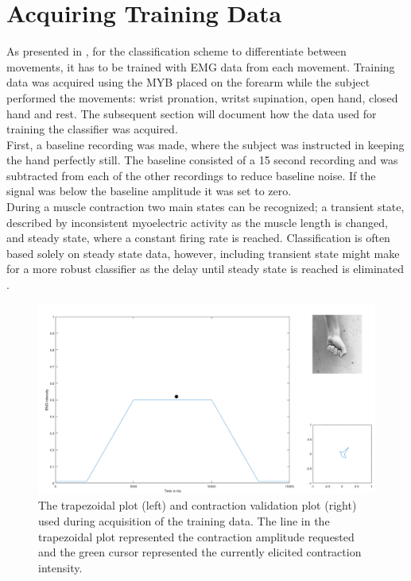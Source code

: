 
\section{Acquiring Training Data}

As presented in , for the classification scheme to differentiate between movements, it has to be trained with EMG data from each movement. Training data was acquired using the MYB placed on the forearm while the subject performed the movements: wrist pronation, writst supination, open hand, closed hand and rest. The subsequent section will document how the data used for training the classifier was acquired. \\
First, a baseline recording was made, where the subject was instructed in keeping the hand perfectly still. The baseline consisted of a 15 second recording and was subtracted from each of the other recordings to reduce baseline noise. If the signal was below the baseline amplitude it was set to zero. \\
During a muscle contraction two main states can be recognized; a transient state, described by inconsistent myoelectric activity as the muscle length is changed, and steady state, where a constant firing rate is reached. \cite{Mobarak2014} Classification is often based solely on steady state data, however, including transient state might make for a more robust classifier as the delay until steady state is reached is eliminated \cite{Boschmann2013,Mobarak2014a}. \\
%

\begin{figure}[H]                 
	\includegraphics[width=.8\textwidth]{figures/trapezoid}  
	\caption{The trapezoidal plot (left) and contraction validation plot (right) used during acquisition of the training data. The line in the trapezoidal plot represented the contraction amplitude requested and the green cursor represented the currently elicited contraction intensity. }
	\label{fig:GUI} 
\end{figure}
\vspace{-1em}

